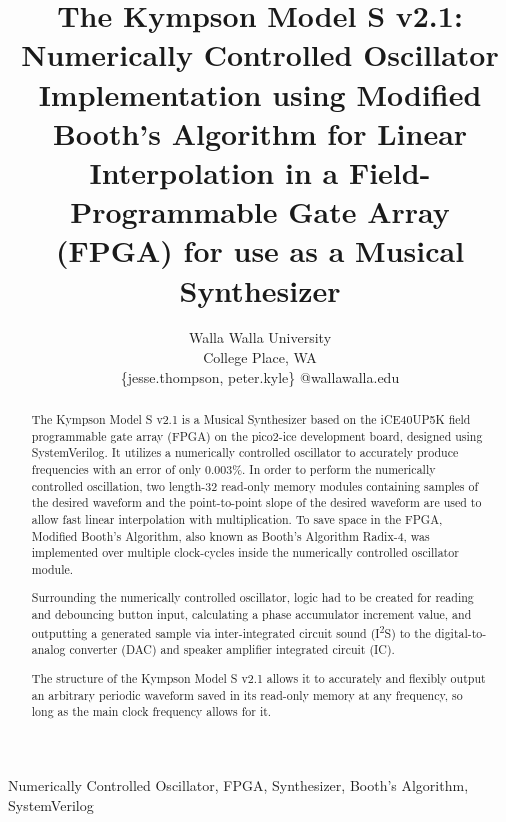 \documentclass[conference]{IEEEtran}
\begin{document}
\title{The Kympson Model S v2.1: Numerically Controlled Oscillator Implementation using Modified Booth's Algorithm for Linear Interpolation in a Field-Programmable Gate Array (FPGA) for use as a Musical Synthesizer\\
}

\author{
Walla Walla University \\
College Place, WA \\
\{jesse.thompson, peter.kyle\} @wallawalla.edu
}

\maketitle

\begin{abstract}
The Kympson Model S v2.1 is a Musical Synthesizer based on the iCE40UP5K field programmable gate array (FPGA) on the pico2-ice development board, designed using SystemVerilog. It utilizes a numerically controlled oscillator to accurately produce frequencies with an error of only 0.003\%. In order to perform the numerically controlled oscillation, two length-32 read-only memory modules containing samples of the desired waveform and the point-to-point slope of the desired waveform are used to allow fast linear interpolation with multiplication. To save space in the FPGA, Modified Booth's Algorithm, also known as Booth's Algorithm Radix-4, was implemented over multiple clock-cycles inside the numerically controlled oscillator module.

Surrounding the numerically controlled oscillator, logic had to be created for reading and debouncing button input, calculating a phase accumulator increment value, and outputting a generated sample via inter-integrated circuit sound (I\textsuperscript{2}S) to the digital-to-analog converter (DAC) and speaker amplifier integrated circuit (IC).

The structure of the Kympson Model S v2.1 allows it to accurately and flexibly output an arbitrary periodic waveform saved in its read-only memory at any frequency, so long as the main clock frequency allows for it.
\end{abstract}

\begin{IEEEkeywords}
Numerically Controlled Oscillator, FPGA, Synthesizer, Booth's Algorithm, SystemVerilog
\end{IEEEkeywords}
\end{document}
